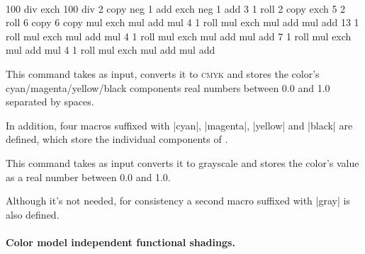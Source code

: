 \begin{command}{\pgfdeclarefunctionalshading{}\\
}
\begin{codeexample}[]
{\pgfpointorigin}{\pgfpoint{100bp}{100bp}}
{
}{
  100 div exch 100 div 2 copy                   %
  neg 1 add exch neg 1 add                      %
  3 1 roll 2 copy exch 5 2 roll 6 copy 6 copy   %
  \firstred mul exch \secondred mul add mul     %
  4 1 roll
  \thirdred mul exch \fourthred mul add mul
  add
  13 1 roll
  \firstgreen mul exch \secondgreen mul add mul %
  4 1 roll
  \thirdgreen mul exch \fourthgreen mul add mul
  add
  7 1 roll
  \firstblue mul exch \secondblue mul add mul   %
  4 1 roll
  \thirdblue mul exch \fourthblue mul add mul
  add
}

\end{codeexample}

    \begin{command}{\pgfshadecolortocmyk{}}
        This command takes  as input, converts it to
        \textsc{cmyk} and stores the color's cyan/magenta/yellow/black
        components real numbers between 0.0 and 1.0 separated by spaces.

        In addition, four macros suffixed with |cyan|, |magenta|, |yellow| and
        |black| are defined, which store the individual components of
        .
    \end{command}

    \begin{command}{\pgfshadecolortogray{}}
        This command takes  as input converts it to grayscale
        and stores the color's value as a real number between 0.0 and 1.0.

        Although it's not needed, for consistency a second macro suffixed with
        |gray| is also defined.
    \end{command}
\end{command}

\paragraph{Color model independent functional shadings.}

